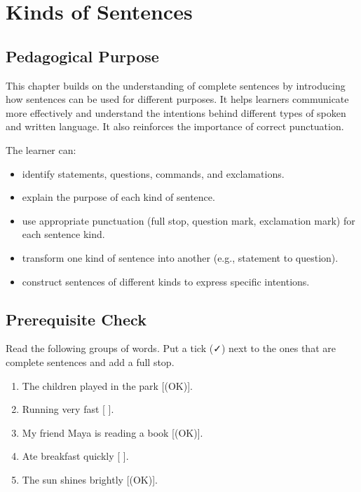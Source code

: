 
\chapter{Kinds of Sentences}

\section{Pedagogical Purpose}
This chapter builds on the understanding of complete sentences by introducing how sentences can be used for different purposes. It helps learners communicate more effectively and understand the intentions behind different types of spoken and written language. It also reinforces the importance of correct punctuation.

\begin{learningobjectives}
The learner can:
\begin{itemize}
    \item identify statements, questions, commands, and exclamations.
    \item explain the purpose of each kind of sentence.
    \item use appropriate punctuation (full stop, question mark, exclamation mark) for each sentence kind.
    \item transform one kind of sentence into another (e.g., statement to question).
    \item construct sentences of different kinds to express specific intentions.
\end{itemize}
\end{learningobjectives}

\section{Prerequisite Check}
\begin{quickcheck}
Read the following groups of words. Put a tick (✓) next to the ones that are complete sentences and add a full stop.
\begin{enumerate}
    \item The children played in the park [(OK)].
    \item Running very fast [ ].
    \item My friend Maya is reading a book [(OK)].
    \item Ate breakfast quickly [ ].
    \item The sun shines brightly [(OK)].
\end{enumerate}
\end{quickcheck}

